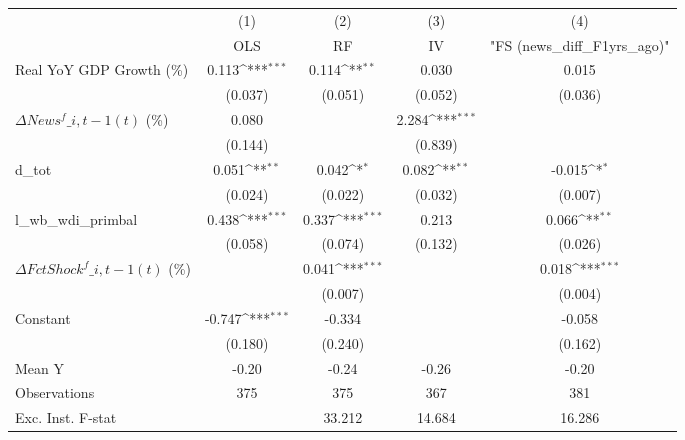 {
\def\sym#1{\ifmmode^{#1}\else\(^{#1}\)\fi}
\begin{tabular}{l*{4}{c}}
\toprule
                    &\multicolumn{1}{c}{(1)}&\multicolumn{1}{c}{(2)}&\multicolumn{1}{c}{(3)}&\multicolumn{1}{c}{(4)}\\
                    &\multicolumn{1}{c}{OLS}&\multicolumn{1}{c}{RF}&\multicolumn{1}{c}{IV}&\multicolumn{1}{c}{ "FS (news\_diff\_F1yrs\_ago)" }\\
\midrule
Real YoY GDP Growth (\%)&       0.113\sym{***}&       0.114\sym{**} &       0.030         &       0.015         \\
                    &     (0.037)         &     (0.051)         &     (0.052)         &     (0.036)         \\
\addlinespace
$ \Delta News^f\_{i,t-1}(t)$ (\%)&       0.080         &                     &       2.284\sym{***}&                     \\
                    &     (0.144)         &                     &     (0.839)         &                     \\
\addlinespace
d\_tot               &       0.051\sym{**} &       0.042\sym{*}  &       0.082\sym{**} &      -0.015\sym{*}  \\
                    &     (0.024)         &     (0.022)         &     (0.032)         &     (0.007)         \\
\addlinespace
l\_wb\_wdi\_primbal    &       0.438\sym{***}&       0.337\sym{***}&       0.213         &       0.066\sym{**} \\
                    &     (0.058)         &     (0.074)         &     (0.132)         &     (0.026)         \\
\addlinespace
$ \Delta FctShock^f\_{i,t-1}(t)$ (\%)&                     &       0.041\sym{***}&                     &       0.018\sym{***}\\
                    &                     &     (0.007)         &                     &     (0.004)         \\
\addlinespace
Constant            &      -0.747\sym{***}&      -0.334         &                     &      -0.058         \\
                    &     (0.180)         &     (0.240)         &                     &     (0.162)         \\
\midrule
Mean Y              &       -0.20         &       -0.24         &       -0.26         &       -0.20         \\
Observations        &         375         &         375         &         367         &         381         \\
Exc. Inst. F-stat   &                     &      33.212         &      14.684         &      16.286         \\
\bottomrule
\end{tabular}
}
